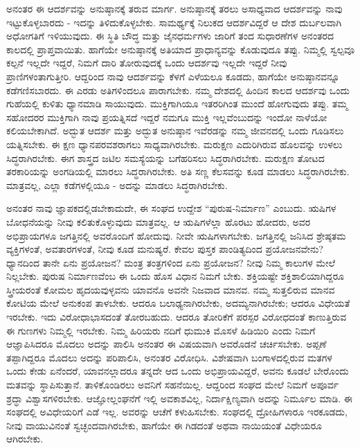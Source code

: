 ಅನಂತರ ಈ ಆದರ್ಶವನ್ನು ಅನುಷ್ಠಾನಕ್ಕೆ ತರುವ ಮಾರ್ಗ. ಅನುಷ್ಠಾನಕ್ಕೆ ತರಲು ಅಸಾಧ್ಯವಾದ ಆದರ್ಶವನ್ನು ನಾವು ಇಟ್ಟುಕೊಳ್ಳಬಾರದು - ಇದನ್ನು ತಿಳಿದುಕೊಳ್ಳಬೇಕು. ಸಾಮರ್ಥ್ಯಕ್ಕೆ ನಿಲುಕದ ಆದರ್ಶವಿದ್ದರೆ ಆ ದೇಶ ದುರ್ಬಲವಾಗಿ ಅಧೋಗತಿಗೆ ಇಳಿಯುವುದು. ಈ ಸ್ಥಿತಿ ಬೌದ್ಧ ಮತ್ತು ಜೈನಧರ್ಮಗಳು ಜಾರಿಗೆ ತಂದ ಸುಧಾರಣೆಗಳ ಅನಂತರದ ಕಾಲದಲ್ಲಿ ಪ್ರಾಪ್ತವಾಯಿತು. ಹಾಗೆಯೇ ಅನುಷ್ಠಾನಕ್ಕೆ ಅತಿಯಾದ ಪ್ರಾಧಾನ್ಯವನ್ನು ಕೊಡುವುದೂ ತಪ್ಪು. ನಿಮ್ಮಲ್ಲಿ ಸ್ವಲ್ಪವೂ ಕಲ್ಪನೆ ಇಲ್ಲದೇ ಇದ್ದರೆ, ನಿಮಗೆ ದಾರಿ ತೋರುವುದಕ್ಕೆ ಒಂದು ಆದರ್ಶವು ಇಲ್ಲದೇ ಇದ್ದರೆ ನೀವು ಪ್ರಾಣಿಗಳಂತಾಗುತ್ತೀರಿ. ಆದ್ದರಿಂದ ನಾವು ಆದರ್ಶವನ್ನು ಕೆಳಗೆ ಎಳೆಯಲೂ ಕೂಡದು, ಹಾಗೆಯೇ ಅನುಷ್ಠಾನವನ್ನೂ ಕಡೆಗಣಿಸಬಾರದು. ಈ ಎರಡು ಅತಿಗಳಿಂದಲೂ ಪಾರಾಗಬೇಕು. ನಮ್ಮ ದೇಶದಲ್ಲಿ ಹಿಂದಿನ ಕಾಲದ ಆದರ್ಶವು ಒಂದು ಗುಹೆಯಲ್ಲಿ ಕುಳಿತು ಧ್ಯಾನಮಾಡಿ ಸಾಯುವುದು. ಮುಕ್ತಿಗಾಗಿಯೂ ಇತರರಿಗಿಂತ ಮುಂದೆ ಹೋಗುವುದು ತಪ್ಪು. ತಮ್ಮ ಸಹೋದರರ ಮುಕ್ತಿಗಾಗಿ ನಾವು ಪ್ರಯತ್ನಿಸದೆ ಇದ್ದರೆ ನಮಗೂ ಮುಕ್ತಿ ಇಲ್ಲವೆಂಬುದನ್ನು ಇಂದೋ ನಾಳೆಯೋ ಕಲಿಯಬೇಕಾಗಿದೆ. ಅದ್ಭುತ ಆದರ್ಶ ಮತ್ತು ಅದ್ಭುತ ಅನುಷ್ಠಾನ ಇವೆರಡನ್ನು ನಮ್ಮ ಜೀವನದಲ್ಲಿ ಒಂದು ಗೂಡಿಸಲು ಯತ್ನಿಸಬೇಕು. ಈ ಕ್ಷಣ ಧ್ಯಾನಪರವಶರಾಗಲು ಸಾಧ್ಯವಾಗಿರಬೇಕು. ಮರುಕ್ಷಣ ಎದುರಿಗಿರುವ ಹೊಲವನ್ನು ಉಳಲು ಸಿದ್ಧರಾಗಿರಬೇಕು. ಈಗ ಶಾಸ್ತ್ರದ ಜಟಿಲ ಸಮಸ್ಯೆಯನ್ನು ಬಗೆಹರಿಸಲು ಸಿದ್ಧರಾಗಿರಬೇಕು. ಮರುಕ್ಷಣ ತೋಟದ ತರಕಾರಿಯನ್ನು ಅಂಗಡಿಯಲ್ಲಿ ಮಾರಲು ಸಿದ್ಧರಾಗಿರಬೇಕು. ಅತಿ ಸಣ್ಣ ಕೆಲಸವನ್ನು ಕೂಡ ಮಾಡಲು ಸಿದ್ಧರಾಗಿರಬೇಕು. ಮಾತ್ರವಲ್ಲ, ಎಲ್ಲಾ ಕಡೆಗಳಲ್ಲಿಯೂ - ಅದನ್ನು ಮಾಡಲು ಸಿದ್ಧರಾಗಿರಬೇಕು.

ಅನಂತರ ನಾವು ಜ್ಞಾಪಕದಲ್ಲಿಡಬೇಕಾದುದೇ, ಈ ಸಂಘದ ಉದ್ದೇಶ “ಪುರುಷ-ನಿರ್ಮಾಣ” ಎಂಬುದು. ಋಷಿಗಳ ಬೋಧನೆಯನ್ನು ನೀವು ಕಲಿತುಕೊಳ್ಳುವುದು ಮಾತ್ರವಲ್ಲ. ಆ ಋಷಿಗಳೆಲ್ಲಾ ಹೊರಟು ಹೋದರು, ಅವರ ಅಭಿಪ್ರಾಯಗಳೂ ಜಗತ್ತಿನಲ್ಲಿ ಅವರೊಂದಿಗೆ ಹೋದುವು. ನೀವೇ ಋಷಿಗಳಾಗಬೇಕು. ಜಗತ್ತಿನಲ್ಲಿ ಜನಿಸಿದ ಶ್ರೇಷ್ಠತಮ ವ್ಯಕ್ತಿಗಳಂತೆ, ಅವತಾರಗಳಂತೆ, ನೀವು ಕೂಡ ಮನುಷ್ಯರೆ. ಕೇವಲ ಪುಸ್ತಕ ಪಾಂಡಿತ್ಯದಿಂದ ಪ್ರಯೋಜನವೇನು? ಧ್ಯಾನದಿಂದ ತಾನೇ ಏನು ಪ್ರಯೋಜನ? ಮಂತ್ರ ತಂತ್ರಗಳಿಂದ ಏನು ಪ್ರಯೋಜನ? ನೀವು ನಿಮ್ಮ ಕಾಲುಗಳ ಮೇಲೆ ನಿಲ್ಲಬೇಕು. ಪುರುಷ ನಿರ್ಮಾಣವೆಂಬ ಈ ಒಂದು ಹೊಸ ವಿಧಾನ ನಿಮಗೆ ಬೇಕು. ಶಕ್ತಿಯಷ್ಟೇ ಶಕ್ತಿಶಾಲಿಯಾಗಿದ್ದರೂ ಸ್ತ್ರೀಯರಂತೆ ಕೋಮಲ ಹೃದಯವುಳ್ಳವನು ಯಾವನೊ ಅವನೇ ನಿಜವಾದ ಮಾನವ. ನಮ್ಮ ಸುತ್ತಲಿರುವ ಮಾನವ ಕೋಟಿಯ ಮೇಲೆ ಅನುಕಂಪ ತಾಳಬೇಕು. ಆದರೂ ಬಲಾಢ್ಯನಾಗಿರಬೇಕು, ಅದಮ್ಯನಾಗಿರಬೇಕು; ಆದರೂ ವಿಧೇಯತೆ ಇರಬೇಕು. ಇದು ವಿರೋಧಾಭಾಸದಂತೆ ತೋರಬಹುದು. ಆದರೂ ತೋರಿಕೆಗೆ ಪರಸ್ಪರ ವಿರೋಧದಂತೆ ಕಾಣುತ್ತಿರುವ ಈ ಗುಣಗಳು ನಿಮ್ಮಲ್ಲಿ ಇರಬೇಕು. ನಿಮ್ಮ ಹಿರಿಯರು ನದಿಗೆ ಧುಮುಕಿ ಮೊಸಳೆ ಹಿಡಿಯಿರಿ ಎಂದು ನಿಮಗೆ ಆಜ್ಞಾಪಿಸಿದರೂ ಮೊದಲು ಅದನ್ನು ಪಾಲಿಸಿ ಅನಂತರ ಈ ವಿಷಯವಾಗಿ ಅವರೊಡನೆ ಚರ್ಚಿಸಬೇಕು. ಅಪ್ಪಣೆ ತಪ್ಪಾಗಿದ್ದರೂ ಮೊದಲು ಅದನ್ನು ಪರಿಪಾಲಿಸಿ, ಅನಂತರ ವಿರೋಧಿಸಿ. ವಿಶೇಷವಾಗಿ ಬಂಗಾಳದಲ್ಲಿರುವ ಮತಗಳ ಒಂದು ಕೇಡು ಏನೆಂದರೆ, ಯಾವನಲ್ಲಾದರೂ ತನ್ನದೇ ಆದ ಒಂದು ಅಭಿಪ್ರಾಯವಿದ್ದರೆ, ಅವನು ಕೂಡಲೆ ಬೇರೊಂದು ಮತವನ್ನು ಸ್ಥಾಪಿಸುತ್ತಾನೆ. ತಾಳಿಕೊಂಡಿರಲು ಅವನಿಗೆ ಸಹನೆಯಿಲ್ಲ. ಆದ್ದರಿಂದ ಸಂಘದ ಮೇಲೆ ನಿಮಗೆ ಅಪೂರ್ವ ಶ್ರದ್ಧಾ ವಿಶ್ವಾಸಗಳಿರಬೇಕು. ಆಜ್ಞೋಲ್ಲಂಘನೆಗೆ ಇಲ್ಲಿ ಅವಕಾಶವಿಲ್ಲ, ನಿರ್ದಾಕ್ಷಿಣ್ಯವಾಗಿ ಅದನ್ನು ನಿರ್ಮೂಲ ಮಾಡಿ. ಈ ಸಂಘದಲ್ಲಿ ಅವಿಧೇಯರಿಗೆ ಎಡೆ ಇಲ್ಲ. ಅವರನ್ನು ಆಚೆಗೆ ಕಳುಹಿಸಬೇಕು. ಸಂಘದಲ್ಲಿ ದ್ರೋಹಿಗಳಾರೂ ಇರಕೂಡದು, ನೀವು ವಾಯುವಿನಂತೆ ಸ್ವಚ್ಛಂದವಾಗಿರಬೇಕು, ಹಾಗೆಯೇ ಈ ಗಿಡದಂತೆ ಅಥವಾ ನಾಯಿಯಂತೆ ವಿಧೇಯರೂ ಆಗಿರಬೇಕು.

